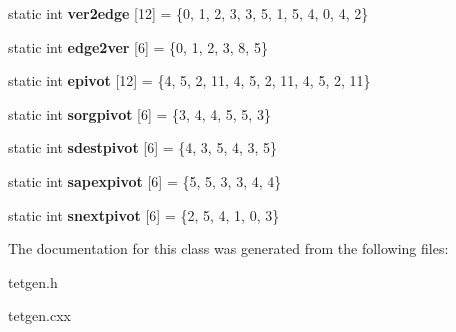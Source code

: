 \begin{DoxyCompactItemize}
\item 
\mbox{\label{classtetgenmesh_ad70ef1b418a713939d2c2470de436afb}} 
static int {\bfseries ver2edge} \mbox{[}12\mbox{]} = \{0, 1, 2, 3, 3, 5, 1, 5, 4, 0, 4, 2\}
\item 
\mbox{\label{classtetgenmesh_a5c068f480e2912a38c19bbbd492e2aae}} 
static int {\bfseries edge2ver} \mbox{[}6\mbox{]} = \{0, 1, 2, 3, 8, 5\}
\item 
\mbox{\label{classtetgenmesh_ab15ad8f91a8c322861e8a399b4199a08}} 
static int {\bfseries epivot} \mbox{[}12\mbox{]} = \{4, 5, 2, 11, 4, 5, 2, 11, 4, 5, 2, 11\}
\item 
\mbox{\label{classtetgenmesh_a36e2c583a5a4148c7ca53888b7bd928d}} 
static int {\bfseries sorgpivot} \mbox{[}6\mbox{]} = \{3, 4, 4, 5, 5, 3\}
\item 
\mbox{\label{classtetgenmesh_a1d8ce836af65d2a6c2c008b43112ca5b}} 
static int {\bfseries sdestpivot} \mbox{[}6\mbox{]} = \{4, 3, 5, 4, 3, 5\}
\item 
\mbox{\label{classtetgenmesh_a25610aea34045250cbd88b54d4734383}} 
static int {\bfseries sapexpivot} \mbox{[}6\mbox{]} = \{5, 5, 3, 3, 4, 4\}
\item 
\mbox{\label{classtetgenmesh_a0d47762d99e1d47863062c532fe61122}} 
static int {\bfseries snextpivot} \mbox{[}6\mbox{]} = \{2, 5, 4, 1, 0, 3\}
\end{DoxyCompactItemize}


The documentation for this class was generated from the following files\+:\begin{DoxyCompactItemize}
\item 
tetgen.\+h\item 
tetgen.\+cxx\end{DoxyCompactItemize}
